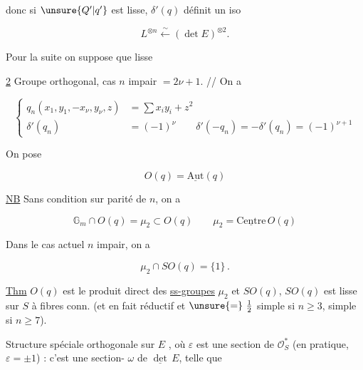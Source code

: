 
donc si $\unsure{Q'|q'}$ est lisse, $\delta'(q)$ définit un iso

\[
 L^{{\otimes}n}\overset{\sim}{\longleftarrow}(\det E)^{\otimes 2}.\tag*{(1.5)}
\]

Pour la suite on suppose que  lisse

\uline{2} Groupe orthogonal, cas $n$ impair $=2\nu+1$. // On a

\[
 \left\{\begin{aligned}
 q_n(x_1,y_1,\mathbin{-}x_\nu,y_\nu,z)&=\sum x_i y_i+z^2\\
 \delta'(q_n)&=(-1)^\nu \qquad \delta'(-q_n)=-\delta'(q_n)=(-1)^{\nu+1}
 \end{aligned}\right.
\]

On pose

\[
 O(q)=\underline{\mathrm{Aut}}(q)
\]


\uline{NB} Sans condition sur parité de $n$, on a


\[
 \mathbb G_m\cap O(q)=\mu_2\subset O(q)\qquad \mu_2=\underline{\mathrm{Centre}}\,O(q)\tag*{(2.1)}
\]

Dans le cas actuel $n$ impair, on a

\[
 \mu_2\cap SO(q)=\{1\}\,.\tag*{(2.2)}
\]

\uline{Thm} $O(q)$ est le produit direct des \uline{ss-groupes} $\mu_2$ et $SO(q)$, $SO(q)$ est lisse sur $S$ à fibres conn. (et en fait  réductif  et $\unsure{=}\ \frac{1}{2}$ simple si $n\geq3$, simple si $n\geq7$).

Structure spéciale orthogonale sur $E$ ,  où $\varepsilon$ est une section de $\mathcal O_S^*$ (en pratique, $\varepsilon=\pm1$) : c'est une section- $\omega$ de $\underline{\det}\,E$, telle que

